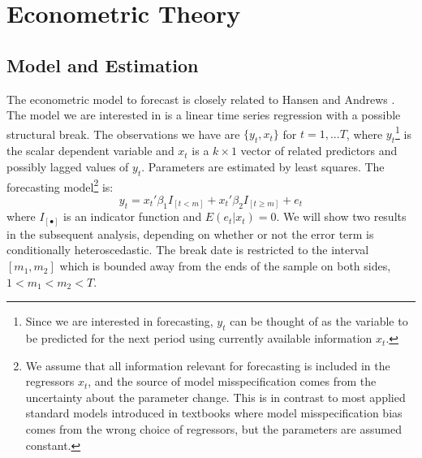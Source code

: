 \section{Econometric Theory}
\subsection{Model and Estimation}
The econometric model to forecast is closely related to Hansen \cite{hansen2009averaging} and Andrews \cite{andrews93}. The model we are interested in is a linear time series regression with a possible structural break. The observations we have are $\{y_t,x_t\}$ for $t = 1,...T$, where $y_t$\footnote{Since we are interested in forecasting, $y_t$ can be thought of as the variable to be predicted for the next period using currently available information $x_t$.} is the scalar dependent variable and $x_t$ is a $k\times 1$ vector of related predictors and possibly lagged values of $y_t$. Parameters are estimated by least squares. The forecasting model\footnote{We assume that all information relevant for forecasting is included in the regressors $x_t$, and the source of model misspecification comes from the uncertainty about the parameter change. This is in contrast to most applied standard models introduced in textbooks where model misspecification bias comes from the wrong choice of regressors, but the parameters are assumed constant.} is:
\begin{equation}
	y_t = x_t'\beta_1 I_{[t<m]} + x_t'\beta_2 I_{[t \geq m]} + e_t
\end{equation}
where $I_{[\bullet]}$ is an indicator function and $E(e_t|x_t) = 0$. We will show two results in the subsequent analysis, depending on whether or not the error term is conditionally heteroscedastic. The break date is restricted to the interval $[m_1,m_2]$ which is bounded away from the ends of the sample on both sides, $1 < m_{1} < m_{2} < T$.

